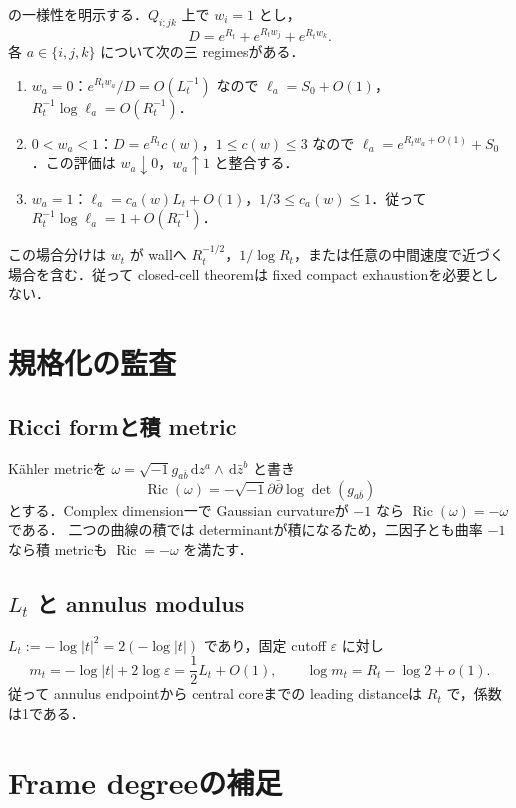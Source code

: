 \documentclass[a4paper,11pt]{ltjsarticle}
\numberwithin{equation}{section}
\theoremstyle{plain}
\theoremstyle{definition}
\theoremstyle{remark}
\newcommand{\eps}{\varepsilon}\newcommand{\dd}{\,\mathrm d}\newcommand{\ddc}{\sqrt{-1}\,\partial\bar\partial}
\newcommand{\Ric}{\operatorname{Ric}}\newcommand{\tr}{\operatorname{tr}}\newcommand{\osc}{\operatorname{osc}}\newcommand{\vol}{\operatorname{Vol}}
\begin{document}
 の一様性を明示する．$Q_{i;jk}$ 上で $w_i=1$ とし，
\[
 D=e^{R_t}+e^{R_tw_j}+e^{R_tw_k}.
\]
各 $a\in\{i,j,k\}$ について次の三 regimesがある．
\begin{enumerate}[label=\textup{(B\arabic*)}]
\item $w_a=0$：$e^{R_tw_a}/D=O(L_t^{-1})$ なので $\ell_a=S_0+O(1)$，$R_t^{-1}\log\ell_a=O(R_t^{-1})$．
\item $0<w_a<1$：$D=e^{R_t}c(w)$，$1\le c(w)\le3$ なので
$\ell_a=e^{R_tw_a+O(1)}+S_0$．この評価は $w_a\downarrow0$，$w_a\uparrow1$ と整合する．
\item $w_a=1$：$\ell_a=c_a(w)L_t+O(1)$，$1/3\le c_a(w)\le1$．従って
$R_t^{-1}\log\ell_a=1+O(R_t^{-1})$．
\end{enumerate}
この場合分けは $w_t$ が wallへ $R_t^{-1/2}$，$1/\log R_t$，または任意の中間速度で近づく場合を含む．従って closed-cell theoremは fixed compact exhaustionを必要としない．

\section{規格化の監査}\label{sharp:app:normalization}

\subsection{Ricci formと積 metric}

Kähler metricを $\omega=\sqrt{-1}g_{a\bar b}\dd z^a\wedge\dd\bar z^b$ と書き
\[
 \Ric(\omega)=-\sqrt{-1}\partial\bar\partial\log\det(g_{a\bar b})
\]
とする．Complex dimension一で Gaussian curvatureが $-1$ なら $\Ric(\omega)=-\omega$ である．
二つの曲線の積では determinantが積になるため，二因子とも曲率 $-1$ なら積 metricも $\Ric=-\omega$ を満たす．

\subsection{\texorpdfstring{$L_t$}{Lt} と annulus modulus}

$L_t:=-\log|t|^2=2(-\log|t|)$ であり，固定 cutoff $\eps$ に対し
\[
 m_t=-\log|t|+2\log\eps=\frac12L_t+O(1),\qquad
 \log m_t=R_t-\log2+o(1).
\]
従って annulus endpointから central coreまでの leading distanceは $R_t$ で，係数は1である．

\section{Frame degreeの補足}\label{sharp:app:frame-degree}
\end{document}
